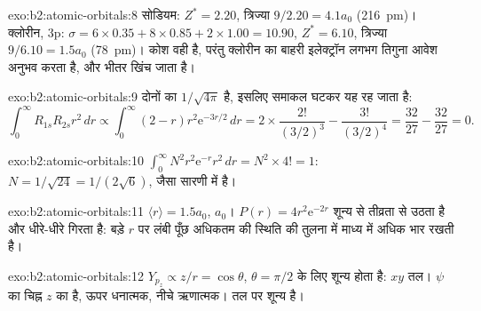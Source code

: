\begin{solution}{exo:b2:atomic-orbitals:8}
सोडियम: $Z^* = 2.20$, त्रिज्या $9/2.20 = 4.1a_0$ (\qty{216}{pm})। क्लोरीन, 3p:
$\sigma = 6 \times 0.35 + 8 \times 0.85 + 2 \times 1.00 = 10.90$, $Z^* = 6.10$, त्रिज्या
$9/6.10 = 1.5a_0$ (\qty{78}{pm})। कोश वही है, परंतु क्लोरीन का बाहरी इलेक्ट्रॉन
लगभग तिगुना आवेश अनुभव करता है, और भीतर खिंच जाता है।
\end{solution}

\begin{solution}{exo:b2:atomic-orbitals:9}
दोनों का  $1/\sqrt{4\pi}$ है, इसलिए समाकल घटकर यह रह जाता है:
\[
  \int_0^\infty R_{1s}R_{2s}r^2\,dr \propto \int_0^\infty (2 - r)r^2\mathrm e^{-3r/2}\,dr =
  2 \times \frac{2!}{(3/2)^3} - \frac{3!}{(3/2)^4} = \frac{32}{27} - \frac{32}{27} = 0 .
\]
\end{solution}

\begin{solution}{exo:b2:atomic-orbitals:10}
$\int_0^\infty N^2r^2\mathrm e^{-r}r^2\,dr = N^2 \times 4! = 1$: $N = 1/\sqrt{24} =
1/(2\sqrt6)$, जैसा सारणी में है।
\end{solution}

\begin{solution}{exo:b2:atomic-orbitals:11}
$\langle r\rangle = 1.5a_0$,  $a_0$। $P(r) = 4r^2\mathrm e^{-2r}$ शून्य से
तीव्रता से उठता है और धीरे-धीरे गिरता है: बड़े $r$ पर लंबी पूँछ अधिकतम की
स्थिति की तुलना में माध्य में अधिक भार रखती है।
\end{solution}

\begin{solution}{exo:b2:atomic-orbitals:12}
$Y_{p_z} \propto z/r = \cos\theta$, $\theta = \pi/2$ के लिए शून्य होता है: $xy$ तल।
$\psi$ का चिह्न $z$ का है, ऊपर धनात्मक, नीचे ऋणात्मक। तल पर
 शून्य है।
\end{solution}


